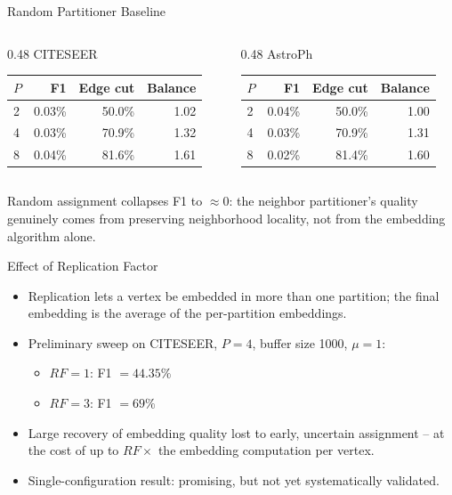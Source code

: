 \documentclass[aspectratio=169]{beamer}
\begin{document}
\begin{frame}{Random Partitioner Baseline}
  \small
  \begin{columns}
    \begin{column}{0.48\textwidth}
      \centering CITESEER
      \begin{tabular}{lrrr}
        \toprule
        $P$ & F1 & Edge cut & Balance \\
        \midrule
        2 & 0.03\% & 50.0\% & 1.02 \\
        4 & 0.03\% & 70.9\% & 1.32 \\
        8 & 0.04\% & 81.6\% & 1.61 \\
        \bottomrule
      \end{tabular}
    \end{column}
    \begin{column}{0.48\textwidth}
      \centering AstroPh
      \begin{tabular}{lrrr}
        \toprule
        $P$ & F1 & Edge cut & Balance \\
        \midrule
        2 & 0.04\% & 50.0\% & 1.00 \\
        4 & 0.03\% & 70.9\% & 1.31 \\
        8 & 0.02\% & 81.4\% & 1.60 \\
        \bottomrule
      \end{tabular}
    \end{column}
  \end{columns}
  \vspace{1em}
  Random assignment collapses F1 to $\approx 0$: the neighbor partitioner's quality genuinely comes from preserving neighborhood locality, not from the embedding algorithm alone.
\end{frame}

\begin{frame}{Effect of Replication Factor}
  \begin{itemize}
    \item Replication lets a vertex be embedded in more than one partition; the final embedding is the average of the per-partition embeddings.
    \item Preliminary sweep on CITESEER, $P=4$, buffer size 1000, $\mu=1$:
    \begin{itemize}
      \item $RF=1$: F1 $= 44.35\%$
      \item $RF=3$: F1 $= 69\%$
    \end{itemize}
    \item Large recovery of embedding quality lost to early, uncertain assignment -- at the cost of up to $RF\times$ the embedding computation per vertex.
    \item Single-configuration result: promising, but not yet systematically validated.
  \end{itemize}
\end{frame}
\end{document}
